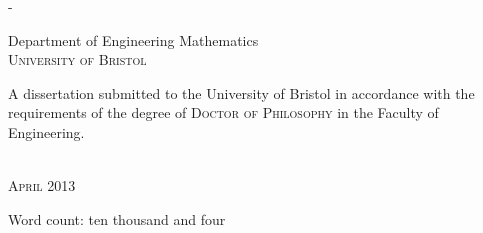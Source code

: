 \begin{titlingpage}
\begin{SingleSpace}
\begin{adjustwidth*}{\unitlength}{-\unitlength}
\begin{center}
\vspace{6mm}
{\large Department of Engineering Mathematics\\
\textsc{University of Bristol}}\\
\vspace{11mm}
\begin{minipage}{10cm}
A dissertation submitted to the University of Bristol in accordance with the requirements of the degree of \textsc{Doctor of Philosophy} in the Faculty of Engineering.
\end{minipage}\\
\vspace{9mm}
{\large\textsc{April 2013}}
\vspace{12mm}
\end{center}
\begin{flushright}
{\small Word count: ten thousand and four}
\end{flushright}
\end{adjustwidth*}
\end{SingleSpace}
\end{titlingpage}